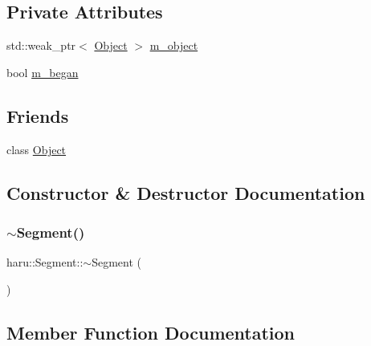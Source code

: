 \subsection*{Private Attributes}
\begin{DoxyCompactItemize}
\item 
std\+::weak\+\_\+ptr$<$ \mbox{\hyperlink{classharu_1_1_object}{Object}} $>$ \mbox{\hyperlink{classharu_1_1_segment_af7740dcdd156244b9b1ac2cba85b6120}{m\+\_\+object}}
\item 
bool \mbox{\hyperlink{classharu_1_1_segment_a57c2851dcf8880898a1175b3fe25bae7}{m\+\_\+began}}
\end{DoxyCompactItemize}
\subsection*{Friends}
\begin{DoxyCompactItemize}
\item 
class \mbox{\hyperlink{classharu_1_1_segment_a0720b5f434e636e22a3ed34f847eec57}{Object}}
\end{DoxyCompactItemize}


\subsection{Constructor \& Destructor Documentation}
\mbox{\label{classharu_1_1_segment_ac21fa3784567cb3c94280c40f4c006ba}} 
\subsubsection{\texorpdfstring{$\sim$\+Segment()}{~Segment()}}
{\footnotesize\ttfamily haru\+::\+Segment\+::$\sim$\+Segment (\begin{DoxyParamCaption}{ }\end{DoxyParamCaption})\hspace{0.3cm}{\ttfamily [virtual]}}



\subsection{Member Function Documentation}
\mbox{\label{classharu_1_1_segment_ab00d15d78e1d3ae9f3199fd90ef52dcb}} 
